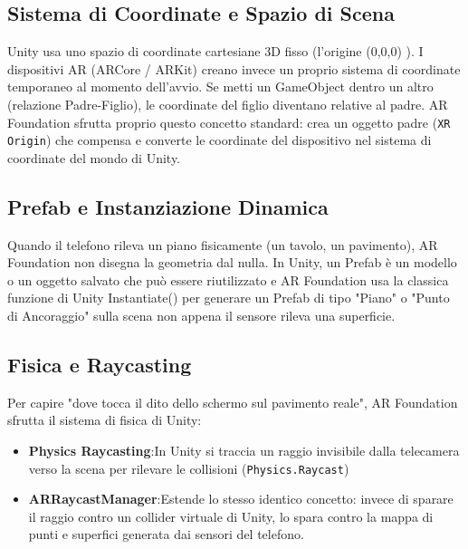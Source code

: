 \subsection{Sistema di Coordinate e Spazio di Scena}
 Unity usa uno spazio di coordinate cartesiane 3D fisso (l'origine (0,0,0) ). I dispositivi AR (ARCore / ARKit) creano invece un proprio sistema di coordinate temporaneo al momento dell'avvio.
Se metti un GameObject dentro un altro (relazione Padre-Figlio), le coordinate del figlio diventano relative al padre. AR Foundation sfrutta proprio questo concetto standard: crea un oggetto padre (\texttt{XR Origin}) che compensa e converte le coordinate del dispositivo nel sistema di coordinate del mondo di Unity.

\subsection{Prefab e Instanziazione Dinamica}
Quando il telefono rileva un piano fisicamente (un tavolo, un pavimento), AR Foundation non disegna la geometria dal nulla.
In Unity, un Prefab è un modello o un oggetto salvato che può essere riutilizzato e AR Foundation usa la classica funzione di Unity Instantiate() per generare un Prefab di tipo "Piano" o "Punto di Ancoraggio" sulla scena non appena il sensore rileva una superficie.

\subsection{Fisica e Raycasting}
Per capire "dove tocca il dito dello schermo sul pavimento reale", AR Foundation sfrutta il sistema di fisica di Unity:
\begin{itemize}
    \item \textbf{Physics Raycasting}:In Unity si traccia un raggio invisibile dalla telecamera verso la scena per rilevare le collisioni (\texttt{Physics.Raycast})
    \item \textbf{ARRaycastManager}:Estende lo stesso identico concetto: invece di sparare il raggio contro un collider virtuale di Unity, lo spara contro la mappa di punti e superfici generata dai sensori del telefono.
\end{itemize}
